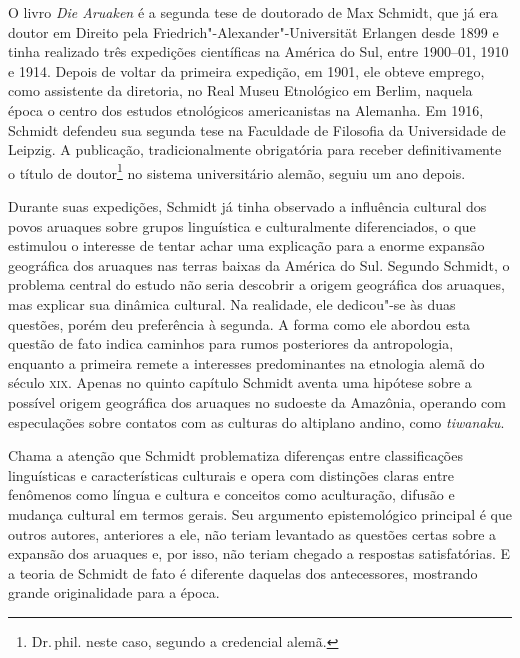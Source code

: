 O livro \textit{Die Aruaken} é a segunda tese de doutorado de Max Schmidt, que já era doutor em Direito pela
Friedrich"-Alexander"-Universität Erlangen desde 1899 e tinha realizado
três expedições científicas na América do Sul, entre 1900--01, 1910 e 1914.
Depois de voltar da primeira expedição, em 1901, ele obteve emprego,
como assistente da diretoria, no Real Museu Etnológico em Berlim,
naquela época o centro dos estudos etnológicos americanistas na
Alemanha. Em 1916, Schmidt defendeu sua segunda tese na Faculdade de
Filosofia da Universidade de Leipzig. A publicação, tradicionalmente
obrigatória para receber definitivamente o título de doutor\footnote{Dr.\,phil. 
neste caso, segundo a credencial alemã.} no sistema universitário alemão, seguiu um ano depois.

Durante suas expedições, Schmidt já tinha observado a influência cultural
dos povos aruaques sobre grupos linguística e culturalmente
diferenciados, o que estimulou o interesse de tentar achar uma
explicação para a enorme expansão geográfica dos aruaques nas terras
baixas da América do Sul. Segundo Schmidt, o problema central do estudo
não seria descobrir a origem geográfica dos aruaques, mas explicar sua
dinâmica cultural. Na realidade, ele dedicou"-se às duas questões, porém
deu preferência à segunda. A forma como ele abordou esta questão de fato
indica caminhos para rumos posteriores da antropologia, enquanto a
primeira remete a interesses predominantes na etnologia alemã do século
\textsc{xix}. Apenas no quinto capítulo Schmidt aventa uma hipótese sobre a possível origem geográfica dos aruaques no sudoeste da Amazônia, operando com
especulações sobre contatos com as culturas do altiplano andino, como
\textit{tiwanaku}.

Chama a atenção que Schmidt problematiza diferenças entre classificações
linguísticas e características culturais e opera com distinções claras
entre fenômenos como língua e cultura e conceitos como aculturação,
difusão e mudança cultural em termos gerais. Seu argumento
epistemológico principal é que outros autores, anteriores a ele, não
teriam levantado as questões certas sobre a expansão dos aruaques e, por
isso, não teriam chegado a respostas satisfatórias. E a teoria de
Schmidt de fato é diferente daquelas dos antecessores, mostrando grande
originalidade para a época.

